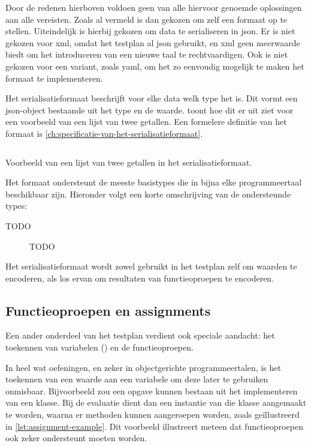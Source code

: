 Door de redenen hierboven voldoen geen van alle hiervoor genoemde oplossingen aan alle vereisten.
Zoals al vermeld is dan gekozen om zelf een formaat op te stellen.
Uiteindelijk is hierbij gekozen om data te serialiseren in json.
Er is niet gekozen voor xml, omdat het testplan al json gebruikt, en xml geen meerwaarde biedt om het introduceren van een nieuwe taal te rechtvaardigen.
Ook is niet gekozen voor een variant, zoals yaml, om het zo eenvoudig mogelijk te maken het formaat te implementeren.

Het serialisatieformaat beschrijft voor elke data welk type het is.
Dit vormt een json-object bestaande uit het type en de waarde.
 toont hoe dit er uit ziet voor een voorbeeld van een lijst van twee getallen.
Een formelere definitie van het formaat is \cref{ch:specificatie-van-het-serialisatieformaat}.

\begin{listing}[h]
    \inputminted{json}{code/format.json}
    \caption{Voorbeeld van een lijst van twee getallen in het serialisatieformaat.}
    \label{lst:serialisation-format}
\end{listing}

Het formaat ondersteunt de meeste basistypes die in bijna elke programmeertaal beschikbaar zijn.
Hieronder volgt een korte omschrijving van de ondersteunde types:

\begin{description}
    \item[TODO] TODO
\end{description}


Het serialisatieformaat wordt zowel gebruikt in het testplan zelf om waarden te encoderen, als los ervan om resultaten van functieoproepen te encoderen.

\subsection{Functieoproepen en assignments}\label{subsec:functieoproepen}

Een ander onderdeel van het testplan verdient ook speciale aandacht: het toekennen van variabelen () en de functieoproepen.

In heel wat oefeningen, en zeker in objectgerichte programmeertalen, is het toekennen van een waarde aan een variabele om deze later te gebruiken onmisbaar.
Bijvoorbeeld zou een opgave kunnen bestaan uit het implementeren van een klasse.
Bij de evaluatie dient dan een instantie van die klasse aangemaakt te worden, waarna er methoden kunnen aangeroepen worden, zoals geïllustreerd in \cref{lst:assignment-example}.
Dit voorbeeld illustreert meteen dat functieoproepen ook zeker ondersteunt moeten worden.


